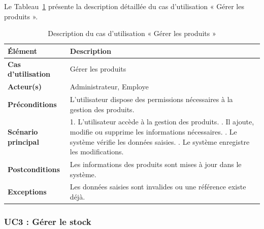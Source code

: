 Le Tableau~\ref{tab:uc2_sprint2} présente la description détaillée du cas d’utilisation « Gérer les produits ».
\begin{longtable}{|>{\raggedright\arraybackslash}p{4cm}|>{\raggedright\arraybackslash}p{10.5cm}|}

\caption{Description du cas d’utilisation « Gérer les produits »}
\label{tab:uc2_sprint2}\\

\hline
\textbf{Élément} & \textbf{Description} \\
\hline

\textbf{Cas d’utilisation} & Gérer les produits \\
\hline

\textbf{Acteur(s)} & Administrateur, Employe \\
\hline

\textbf{Préconditions} &
L’utilisateur dispose des permissions nécessaires à la gestion des produits. \\
\hline

\textbf{Scénario principal} &

1. L’utilisateur accède à la gestion des produits. \newline
2. Il ajoute, modifie ou supprime les informations nécessaires. \newline
3. Le système vérifie les données saisies. \newline
4. Le système enregistre les modifications. \\
   \hline

\textbf{Postconditions} &
Les informations des produits sont mises à jour dans le système. \\
\hline

\textbf{Exceptions} &
Les données saisies sont invalides ou une référence existe déjà. \\
\hline

\end{longtable}

\vspace{0.3cm}
\subsubsection{UC3 : Gérer le stock}

